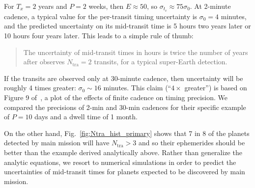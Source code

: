 For $T_x = 2$ years and $P = 2$ weeks, then $E \approx 50$, so $\sigma_{t_c}\approx 75\sigma_0$. 
At 2-minute cadence, a typical value for the per-transit timing uncertainty is $\sigma_0 = 4$ minutes, and the predicted uncertainty on its mid-transit time is 5 hours two years later or 10 hours four years later. This leads to a simple rule of thumb: %
\begin{quotation}
	The uncertainty of mid-transit times in hours is twice the number of years after \tess observes $N_\mathrm{tra}=2$ transits, for a typical super-Earth detection.	
\end{quotation}
If the transits are observed only at 30-minute cadence, then uncertainty will be roughly 4 times greater: $\sigma_0 \sim 16$ minutes. 
This claim (``$4\times$ greater'') is based on Figure 9 of~\citep{price_transit_2014}, a plot of the effects of finite cadence on timing precision. %
We compared the precisions of 2-min and 30-min cadences for their specific example of $P=10$ days and a dwell time of 1 month.

On the other hand, Fig.~\ref{fig:Ntra_hist_primary} shows that 7 in 8 of the planets detected by \tesss main mission will have $N_\mathrm{tra}>3$ and so their ephemerides should be better than the example derived analytically above.
Rather than generalize the analytic equations, we resort to numerical simulations in order to predict the uncertainties of mid-transit times for planets expected to be discovered by \tesss main mission.

